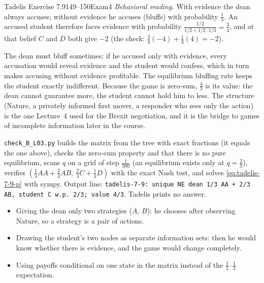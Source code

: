 \begin{exsol}{Tadelis Exercise 7.9}{149--150}{Exam}{4}
\emph{Behavioral reading.} With evidence the dean always accuses; without evidence he accuses
(bluffs) with probability $\frac13$. An accused student therefore faces evidence with probability
$\frac{1/2}{1/2 + 1/2\cdot1/3} = \frac34$, and at that belief $C$ and $D$ both give $-2$ (the check:
$\frac34(-4) + \frac14(4) = -2$).

\interp The dean must bluff sometimes: if he accused only with evidence, every accusation would
reveal evidence and the student would confess, which in turn makes accusing without evidence
profitable. The equilibrium bluffing rate keeps the student exactly indifferent. Because the game
is zero-sum, $\frac43$ is its value: the dean cannot guarantee more, the student cannot hold him
to less. The structure (Nature, a privately informed first mover, a responder who sees only the
action) is the one Lecture~4 used for the Brexit negotiation, and it is the bridge to games of
incomplete information later in the course.

\verify \texttt{check\_B\_L03.py} builds the matrix from the tree with exact fractions (it equals the
one above), checks the zero-sum property and that there is no pure equilibrium, scans $q$ on a grid
of step $\frac1{300}$ (an equilibrium exists only at $q = \frac23$), verifies
$(\frac13 AA + \frac23 AB,\ \frac23 C + \frac13 D)$ with the exact Nash test, and solves
\eqref{eq:tadelis-7-9-p} with sympy. Output line: \texttt{tadelis-7-9: unique NE dean 1/3 AA + 2/3
AB, student C w.p. 2/3; value 4/3}. Tadelis prints no answer.

\mistakes
\begin{itemize}
  \item Giving the dean only two strategies ($A$, $B$): he chooses after observing Nature, so a
  strategy is a pair of actions.
  \item Drawing the student's two nodes as separate information sets: then he would know whether
  there is evidence, and the game would change completely.
  \item Using payoffs conditional on one state in the matrix instead of the $\frac12$--$\frac12$
  expectation.
\end{itemize}

\end{exsol}
